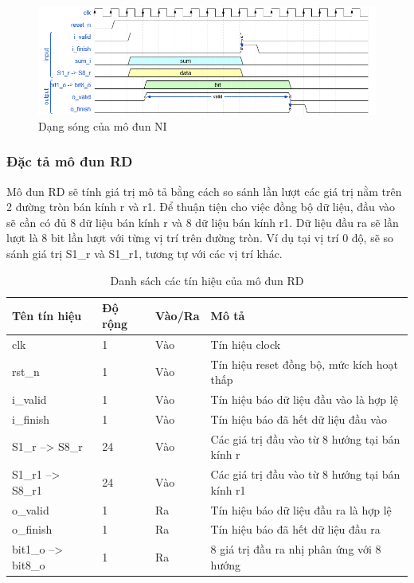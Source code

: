 \begin{figure}[H]
    \centering
    \includegraphics[width=\linewidth]{figures/ni.png}
    \caption{Dạng sóng của mô đun NI}
    \label{fig:ni}
\end{figure}

\subsubsection{Đặc tả mô đun RD}
Mô đun RD sẽ tính giá trị mô tả bằng cách so sánh lần lượt các giá trị nằm trên 2 đường tròn bán kính r và r1. Để thuận tiện cho việc đồng bộ dữ liệu, đầu vào sẽ cần có đủ 8 dữ liệu bán kính r và 8 dữ liệu bán kính r1. Dữ liệu đầu ra sẽ lần lượt là 8 bit lần lượt với từng vị trí trên đường tròn. Ví dụ tại vị trí 0 độ, sẽ so sánh giá trị S1\_r và S1\_r1, tương tự với các vị trí khác. 
\begin{table}[H]
    \centering
    \renewcommand{\arraystretch}{1.3} %
    \begin{tabular}{|p{3cm} p{2cm} p{2cm} p{8cm}|}
        \hline
        \rowcolor{gray!30}
        \textbf{Tên tín hiệu} & \textbf{Độ rộng} & \textbf{Vào/Ra} & \textbf{Mô tả} \\
        \hline
        clk & 1 & Vào & Tín hiệu clock \\
        \hline
        rst\_n & 1 & Vào & Tín hiệu reset đồng bộ, mức kích hoạt thấp \\
        \hline
        i\_valid & 1 & Vào & Tín hiệu báo dữ liệu đầu vào là hợp lệ \\
        \hline
        i\_finish & 1 & Vào & Tín hiệu báo đã hết dữ liệu đầu vào \\
        \hline
        S1\_r --> S8\_r & 24 & Vào & Các giá trị đầu vào từ 8 hướng tại bán kính r\\
        \hline
        S1\_r1 --> S8\_r1 & 24 & Vào & Các giá trị đầu vào từ 8 hướng tại bán kính r1\\
        \hline
        o\_valid & 1 & Ra & Tín hiệu báo dữ liệu đầu ra là hợp lệ\\
        \hline
        o\_finish & 1 & Ra & Tín hiệu báo đã hết dữ liệu đầu ra \\
        \hline
        bit1\_o --> bit8\_o & 1 & Ra & 8 giá trị đầu ra nhị phân ứng với 8 hướng \\
        \hline
    \end{tabular}
    \caption{Danh sách các tín hiệu của mô đun RD}
    \label{tab:signalListRD}
\end{table}
